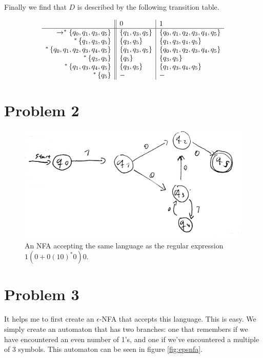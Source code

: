 \documentclass{article}
\begin{document}
Finally we find that $D$ is described by the following transition table.

\begin{align*}
    \begin{array}{r||l| l}
         &0 & 1 \\ \hline
        \to ^*\set{q_0,q_1,q_3,q_5} & \set{q_1, q_3, q_5} & \set{q_0, q_1,q_2,q_3,q_4,q_5} \\
        ^*\set{q_1, q_3, q_5} & \set{q_3,q_5} & \set{q_1, q_3, q_4, q_5}\\
        ^*\set{q_0, q_1,q_2,q_3,q_4,q_5} & \set{q_1, q_3, q_5} & \set{q_0, q_1,q_2,q_3,q_4,q_5} \\
        ^*\set{q_3,q_5} & \set{q_5} & \set{q_3,q_5}\\
        ^*\set{q_1, q_3, q_4, q_5} & \set{q_3,q_5} & \set{q_1,q_3,q_4, q_5}\\
        ^*\set{q_5} & - & -
    \end{array}
\end{align*}

\newpage
\section*{Problem 2}

\begin{figure}[htpb]
    \centering
    \includegraphics[width=0.8\linewidth]{nfa}
    \caption{An NFA accepting the same language as the regular expression $1(0 + 0(10)^*0)0$.}
\end{figure}

\newpage
\section*{Problem 3}

It helps me to first create an $\epsilon$-NFA that accepts this language. This is easy. We simply create an automaton that has two branches: one that remembers if we have encountered an even number of 1's, and one if we've encountered a multiple of 3 symbols. This automaton can be seen in figure \ref{fig:epsnfa}.
\end{document}
